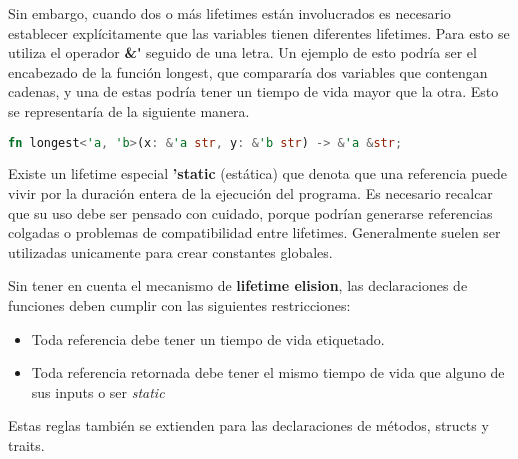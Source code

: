 Sin embargo, cuando dos o más lifetimes están involucrados es necesario establecer explícitamente que las variables tienen diferentes lifetimes. Para esto se utiliza el operador \textbf{\&\'} seguido de una letra. Un ejemplo de esto podría ser el encabezado de la función longest, que compararía dos variables que contengan cadenas, y una de estas podría tener un tiempo de vida mayor que la otra. Esto se representaría de la siguiente manera.

\begin{lstlisting}[language=Rust]
    fn longest<'a, 'b>(x: &'a str, y: &'b str) -> &'a &str;
\end{lstlisting}

Existe un lifetime especial \textbf{'static} (estática) que denota que una referencia puede vivir por la duración entera de la ejecución del programa. Es necesario recalcar que su uso debe ser pensado con cuidado, porque podrían generarse referencias colgadas o problemas de compatibilidad entre lifetimes. Generalmente suelen ser utilizadas unicamente para crear constantes globales.

Sin tener en cuenta el mecanismo de \textbf{lifetime elision}, las declaraciones de funciones deben cumplir con las siguientes restricciones:
\begin{itemize}
    \item Toda referencia debe tener un tiempo de vida etiquetado.
    \item Toda referencia retornada debe tener el mismo tiempo de vida que alguno de sus inputs o ser \textit{static}
\end{itemize}
Estas reglas también se extienden para las declaraciones de métodos, structs y traits.

